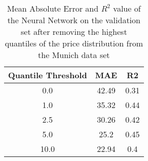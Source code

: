 \begin{table}[t]
  \centering
  \begin{tabular}{@{}ccc@{}}
    \toprule
    Quantile Threshold & MAE   & R2   \\ \midrule
    0.0                & 42.49 & 0.31 \\
    1.0                & 35.32 & 0.44 \\
    2.5                & 30.26 & 0.42 \\
    5.0                & 25.2  & 0.45 \\
    10.0               & 22.94 & 0.4  \\ \bottomrule
  \end{tabular}
  \caption{Mean Absolute Error and $R^2$ value of the Neural Network on the validation set after removing the highest quantiles of the price distribution from the Munich data set}
  \label{tab:munich-outliers}
\end{table}








